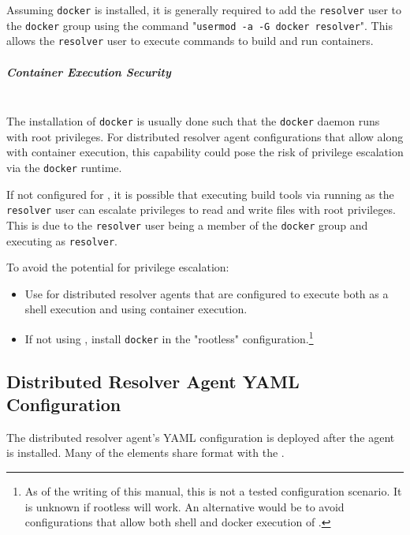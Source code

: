 Assuming \texttt{docker} is installed, it is generally required to add the \texttt{resolver} user to the \texttt{docker}
group using the command "\texttt{usermod -a -G docker resolver}".  This allows the \texttt{resolver} user to execute
commands to build and run containers.

\subparagraph{Container Execution Security}
\noindent\\The installation of \texttt{docker} is usually done such that the \texttt{docker} daemon runs with
root privileges.  For distributed resolver agent configurations that allow 
 along with container execution, this capability could pose
the risk of privilege escalation via the \texttt{docker} runtime.

If not configured for , it is possible that
executing build tools via \scaresolver running as the \texttt{resolver} user can escalate privileges
to read and write files with root privileges.  This is due to the \texttt{resolver} user being a member of
the \texttt{docker} group and \scaresolver executing as \texttt{resolver}.  

To avoid the potential for privilege escalation:

\begin{itemize}
  \item Use  for distributed resolver agents that are configured
    to execute \scaresolver both as a shell execution and using container execution.
  \item If not using , install \texttt{docker} in the "rootless"
    configuration.\footnote{As of the writing of this manual, this is not a tested configuration scenario.  It is unknown if rootless will work.
    An alternative would be to avoid configurations that allow both shell and docker execution of \scaresolverns.}
\end{itemize}



\subsection{Distributed Resolver Agent YAML Configuration}

The distributed resolver agent's YAML configuration is deployed after the agent is installed.
Many of the elements share format with the . 


